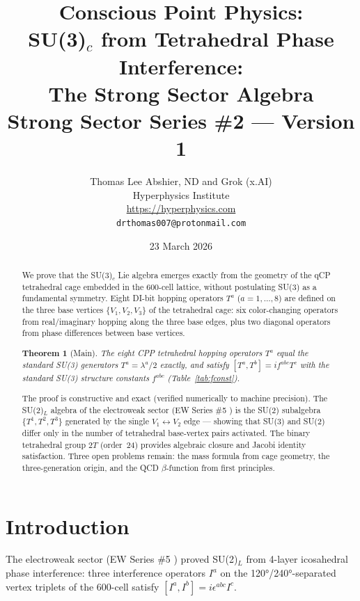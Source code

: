 \documentclass[11pt,a4paper]{article}
\title{\textbf{Conscious Point Physics:\\
SU(3)$_c$ from Tetrahedral Phase Interference:\\
The Strong Sector Algebra}\\[6pt]
{\large Strong Sector Series \#2 --- Version 1}}
\author{Thomas Lee Abshier, ND and Grok (x.AI)\\
Hyperphysics Institute\\
\url{https://hyperphysics.com}\\
\texttt{drthomas007@protonmail.com}}
\date{23 March 2026}
\newtheorem*{theorem*}{Theorem}  %
\begin{document}
\maketitle

\begin{abstract}
We prove that the SU(3)$_c$ Lie algebra emerges exactly from the
geometry of the qCP tetrahedral cage embedded in the 600-cell lattice,
without postulating SU(3) as a fundamental symmetry.  Eight DI-bit
hopping operators $T^a$ ($a = 1,\ldots,8$) are defined on the three
base vertices $\{V_1, V_2, V_3\}$ of the tetrahedral cage:
six color-changing operators from real/imaginary hopping along the
three base edges, plus two diagonal operators from phase differences
between base vertices.

\begin{theorem*}[Main]
The eight CPP tetrahedral hopping operators $T^a$ equal the
standard SU(3) generators $T^a = \lambda^a/2$ exactly, and
satisfy $[T^a, T^b] = if^{abc}T^c$ with the standard SU(3)
structure constants $f^{abc}$ (Table~\ref{tab:fconst}).
\end{theorem*}

The proof is constructive and exact (verified numerically to machine
precision).  The SU(2)$_L$ algebra of the electroweak sector
(EW Series \#5 \citep{cpp_ew5}) is the SU(2) subalgebra
$\{T^1, T^2, T^3\}$ generated by the single $V_1 \leftrightarrow V_2$
edge --- showing that SU(3) and SU(2) differ only in the number of
tetrahedral base-vertex pairs activated.  The binary tetrahedral group
$2T$ (order~24) provides algebraic closure and Jacobi identity
satisfaction.  Three open problems remain: the mass formula from cage
geometry, the three-generation origin, and the QCD $\beta$-function
from first principles.
\end{abstract}

\tableofcontents
\newpage

\section{Introduction}

The electroweak sector (EW Series \#5 \citep{cpp_ew5}) proved
SU(2)$_L$ from 4-layer icosahedral phase interference: three
interference operators $I^a$ on the 120°/240°-separated vertex
triplets of the 600-cell satisfy $[I^a, I^b] = i\epsilon^{abc}I^c$.
\end{document}
